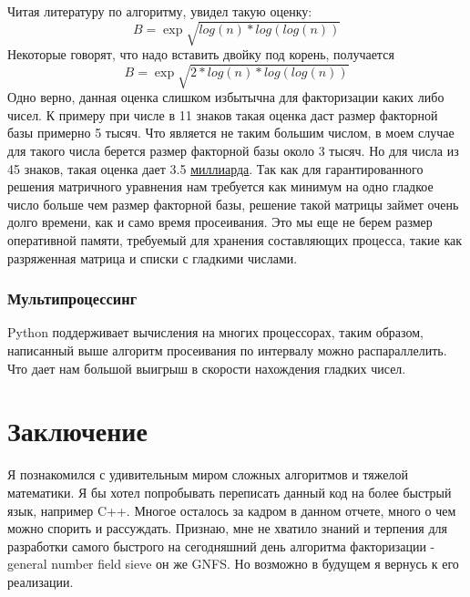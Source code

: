 Читая литературу по алгоритму, увидел такую оценку: 
$$B = \exp{\sqrt{log(n)*log(log(n))}}$$
Некоторые говорят, что надо вставить двойку под корень, получается 
$$B = \exp{\sqrt{2*log(n)*log(log(n))}}$$
Одно верно, данная оценка слишком избытычна для факторизации каких либо чисел. К примеру при числе в 11 знаков такая оценка даст размер факторной базы примерно 5 тысяч. Что является не таким большим числом, в моем случае для такого числа берется размер факторной базы около 3 тысяч. Но для числа из 45 знаков, такая оценка дает 3.5 \underline{миллиарда}. Так как для гарантированного решения матричного уравнения нам требуется как минимум на одно гладкое число больше чем размер факторной базы, решение такой матрицы займет очень долго времени, как и само время просеивания. Это мы еще не берем размер оперативной памяти, требуемый для хранения составляющих процесса, такие как разряженная матрица и списки с гладкими числами.

\subsubsection{Мультипроцессинг}

Python поддерживает вычисления на многих процессорах, таким образом, написанный выше алгоритм просеивания по интервалу можно распараллелить. Что дает нам большой выигрыш в скорости нахождения гладких чисел.



\section{Заключение}

Я познакомился с удивительным миром сложных алгоритмов и тяжелой математики. Я бы хотел попробывать переписать данный код на более быстрый язык, например C++. Многое осталось за кадром в данном отчете, много о чем можно спорить и рассуждать. Признаю, мне не хватило знаний и терпения для разработки самого быстрого на сегодняшний день алгоритма факторизации - general number field sieve он же GNFS. Но возможно в будущем я вернусь к его реализации.

\pagebreak







